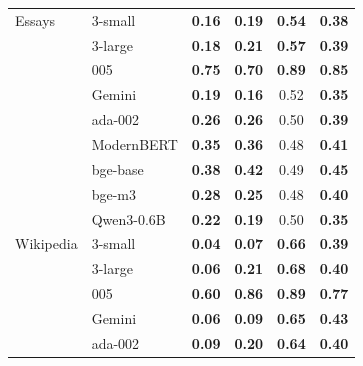\begin{table}[htbp]
\begin{tabular}{llcccc}
\midrule
Essays & 3-small & \cellcolor{tabB!30}\textbf{0.16} & \cellcolor{tabB!28}\textbf{0.19} & \cellcolor{tabV!3}\textbf{0.54} & \cellcolor{tabB!11}\textbf{0.38} \\
 & 3-large & \cellcolor{tabB!29}\textbf{0.18} & \cellcolor{tabB!26}\textbf{0.21} & \cellcolor{tabV!6}\textbf{0.57} & \cellcolor{tabB!10}\textbf{0.39} \\
 & 005 & \cellcolor{tabV!23}\textbf{0.75} & \cellcolor{tabV!18}\textbf{0.70} & \cellcolor{tabV!35}\textbf{0.89} & \cellcolor{tabV!31}\textbf{0.85} \\
 & Gemini & \cellcolor{tabB!28}\textbf{0.19} & \cellcolor{tabB!30}\textbf{0.16} & \cellcolor{tabV!2}0.52 & \cellcolor{tabB!13}\textbf{0.35} \\
 & ada-002 & \cellcolor{tabB!22}\textbf{0.26} & \cellcolor{tabB!21}\textbf{0.26} & 0.50 & \cellcolor{tabB!10}\textbf{0.39} \\
 & ModernBERT & \cellcolor{tabB!13}\textbf{0.35} & \cellcolor{tabB!13}\textbf{0.36} & \cellcolor{tabB!2}0.48 & \cellcolor{tabB!8}\textbf{0.41} \\
 & bge-base & \cellcolor{tabB!11}\textbf{0.38} & \cellcolor{tabB!7}\textbf{0.42} & 0.49 & \cellcolor{tabB!4}\textbf{0.45} \\
 & bge-m3 & \cellcolor{tabB!20}\textbf{0.28} & \cellcolor{tabB!23}\textbf{0.25} & \cellcolor{tabB!2}0.48 & \cellcolor{tabB!9}\textbf{0.40} \\
 & Qwen3-0.6B & \cellcolor{tabB!25}\textbf{0.22} & \cellcolor{tabB!28}\textbf{0.19} & 0.50 & \cellcolor{tabB!14}\textbf{0.35} \\
\midrule
Wikipedia & 3-small & \cellcolor{tabB!41}\textbf{0.04} & \cellcolor{tabB!39}\textbf{0.07} & \cellcolor{tabV!14}\textbf{0.66} & \cellcolor{tabB!10}\textbf{0.39} \\
 & 3-large & \cellcolor{tabB!40}\textbf{0.06} & \cellcolor{tabB!26}\textbf{0.21} & \cellcolor{tabV!16}\textbf{0.68} & \cellcolor{tabB!9}\textbf{0.40} \\
 & 005 & \cellcolor{tabV!9}\textbf{0.60} & \cellcolor{tabV!33}\textbf{0.86} & \cellcolor{tabV!35}\textbf{0.89} & \cellcolor{tabV!25}\textbf{0.77} \\
 & Gemini & \cellcolor{tabB!40}\textbf{0.06} & \cellcolor{tabB!37}\textbf{0.09} & \cellcolor{tabV!14}\textbf{0.65} & \cellcolor{tabB!6}\textbf{0.43} \\
 & ada-002 & \cellcolor{tabB!37}\textbf{0.09} & \cellcolor{tabB!27}\textbf{0.20} & \cellcolor{tabV!12}\textbf{0.64} & \cellcolor{tabB!9}\textbf{0.40} \\

\end{tabular}
\end{table}
